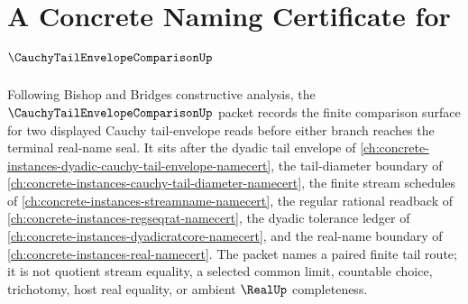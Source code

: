 \chapter{A Concrete Naming Certificate for $\CauchyTailEnvelopeComparisonUp$}
\label{ch:concrete-instances-cauchy-tail-envelope-comparison-namecert}

Following Bishop and Bridges constructive analysis, the $\CauchyTailEnvelopeComparisonUp$ packet records the finite comparison surface for two displayed Cauchy tail-envelope reads before either branch reaches the terminal real-name seal. It sits after the dyadic tail envelope of \autoref{ch:concrete-instances-dyadic-cauchy-tail-envelope-namecert}, the tail-diameter boundary of \autoref{ch:concrete-instances-cauchy-tail-diameter-namecert}, the finite stream schedules of \autoref{ch:concrete-instances-streamname-namecert}, the regular rational readback of \autoref{ch:concrete-instances-regseqrat-namecert}, the dyadic tolerance ledger of \autoref{ch:concrete-instances-dyadicratcore-namecert}, and the real-name boundary of \autoref{ch:concrete-instances-real-namecert}. The packet names a paired finite tail route; it is not quotient stream equality, a selected common limit, countable choice, trichotomy, host real equality, or ambient $\RealUp$ completeness.

